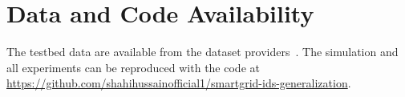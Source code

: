 \documentclass[conference]{IEEEtran}
\begin{document}
\section*{Data and Code Availability}
The testbed data are available from the dataset providers~\cite{morris2014dataset}. The simulation and all experiments can be reproduced with the code at \url{https://github.com/shahihussainofficial1/smartgrid-ids-generalization}.



\end{document}
